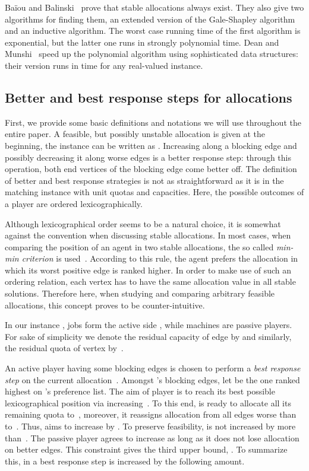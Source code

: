 \documentclass{llncs}
\begin{document}
Ba\"iou and Balinski~\cite{DBLP:journals/mor/BaiouB02} prove that stable allocations always exist. They also give two algorithms for finding them, an extended version of the Gale-Shapley algorithm and an inductive algorithm. The worst case running time of the first algorithm is exponential, but the latter one runs in strongly polynomial time. Dean and Munshi~\cite{DBLP:journals/algorithmica/DeanM10} speed up the polynomial algorithm using sophisticated data structures: their version runs in  time for any real-valued instance.

\subsection{Better and best response steps for allocations}

First, we provide some basic definitions and notations we will use throughout the entire paper. A feasible, but possibly unstable allocation  is given at the beginning, the instance can be written as . Increasing  along a blocking edge and possibly decreasing it along worse edges is a better response step: through this operation, both end vertices of the blocking edge come better off. The definition of better and best response strategies is not as straightforward as it is in the matching instance with unit quotas and capacities. Here, the possible outcomes of a player are ordered lexicographically.

Although lexicographical order seems to be a natural choice, it is somewhat against the convention when discussing stable allocations. In most cases, when comparing the position of an agent in two stable allocations, the so called \emph{min-min criterion} is used~\cite{DBLP:journals/mor/BaiouB02}. According to this rule, the agent prefers the allocation in which its worst positive edge is ranked higher. In order to make use of such an ordering relation, each vertex has to have the same allocation value in all stable solutions. Therefore here, when studying and comparing arbitrary feasible allocations, this concept proves to be counter-intuitive.

In our instance , jobs form the active side , while machines  are passive players. For sake of simplicity we denote the residual capacity  of edge  by  and similarly, the residual quota  of vertex  by~.

An active player  having some blocking edges is chosen to perform a \emph{best response step} on the current allocation~. Amongst 's blocking edges, let  be the one ranked highest on 's preference list. The aim of player  is to reach its best possible lexicographical position via increasing~. To this end,  is ready to allocate all its remaining quota  to~, moreover, it reassigns allocation from all edges worse than  to~. Thus,  aims to increase  by . To preserve feasibility,  is not increased by more than~. The passive player  agrees to increase  as long as it does not lose allocation on better edges. This constraint gives the third upper bound, . To summarize this, in a best response step  is increased by the following amount.
\end{document}

